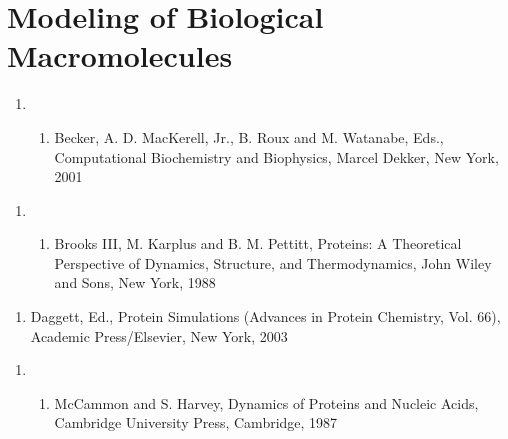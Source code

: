 \documentclass[letterpaper,11pt,english]{sphinxmanual}
\begin{document}
\section{Modeling of Biological Macromolecules}
\label{\detokenize{text/references:modeling-of-biological-macromolecules}}\begin{enumerate}
%
\setcounter{enumi}{14}
\item {} \begin{enumerate}
%
\setcounter{enumii}{12}
\item {} 
Becker, A. D. MacKerell, Jr., B. Roux and M. Watanabe, Eds., Computational Biochemistry and Biophysics, Marcel Dekker, New York, 2001

\end{enumerate}

\end{enumerate}
\begin{enumerate}
%
\setcounter{enumi}{2}
\item {} \begin{enumerate}
%
\setcounter{enumii}{11}
\item {} 
Brooks III, M. Karplus and B. M. Pettitt, Proteins: A Theoretical Perspective of Dynamics, Structure, and Thermodynamics, John Wiley and Sons, New York, 1988

\end{enumerate}

\end{enumerate}
\begin{enumerate}
%
\setcounter{enumi}{21}
\item {} 
Daggett, Ed., Protein Simulations (Advances in Protein Chemistry, Vol. 66), Academic Press/Elsevier, New York, 2003

\end{enumerate}
\begin{enumerate}
%
\setcounter{enumi}{9}
\item {} \begin{enumerate}
%
\item {} 
McCammon and S. Harvey, Dynamics of Proteins and Nucleic Acids, Cambridge University Press, Cambridge, 1987

\end{enumerate}

\end{enumerate}
\end{document}
